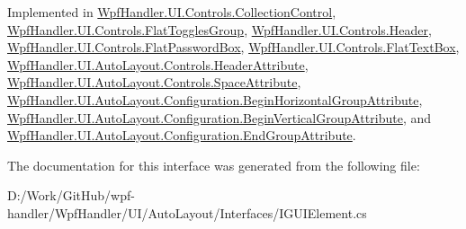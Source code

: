 Implemented in \mbox{\hyperlink{class_wpf_handler_1_1_u_i_1_1_controls_1_1_collection_control_a54cf416fee122e600059ed8713d75bb0}{Wpf\+Handler.\+U\+I.\+Controls.\+Collection\+Control}}, \mbox{\hyperlink{class_wpf_handler_1_1_u_i_1_1_controls_1_1_flat_toggles_group_a5619e5107d6cbc3fb2cdabb21deb40a4}{Wpf\+Handler.\+U\+I.\+Controls.\+Flat\+Toggles\+Group}}, \mbox{\hyperlink{class_wpf_handler_1_1_u_i_1_1_controls_1_1_header_a23ac86ea123581ee90d1aa9b6a81dadd}{Wpf\+Handler.\+U\+I.\+Controls.\+Header}}, \mbox{\hyperlink{class_wpf_handler_1_1_u_i_1_1_controls_1_1_flat_password_box_a8a06600a127d2b9bc7a1a04767f383e8}{Wpf\+Handler.\+U\+I.\+Controls.\+Flat\+Password\+Box}}, \mbox{\hyperlink{class_wpf_handler_1_1_u_i_1_1_controls_1_1_flat_text_box_a9885e81c438caeec3448c99796503a71}{Wpf\+Handler.\+U\+I.\+Controls.\+Flat\+Text\+Box}}, \mbox{\hyperlink{class_wpf_handler_1_1_u_i_1_1_auto_layout_1_1_controls_1_1_header_attribute_a837805f9b975447e7cf5663119189c37}{Wpf\+Handler.\+U\+I.\+Auto\+Layout.\+Controls.\+Header\+Attribute}}, \mbox{\hyperlink{class_wpf_handler_1_1_u_i_1_1_auto_layout_1_1_controls_1_1_space_attribute_abc4dedcaa52529fb4f0e227fb2386866}{Wpf\+Handler.\+U\+I.\+Auto\+Layout.\+Controls.\+Space\+Attribute}}, \mbox{\hyperlink{class_wpf_handler_1_1_u_i_1_1_auto_layout_1_1_configuration_1_1_begin_horizontal_group_attribute_a8bb61f969389bece86c87fbfa44d4c82}{Wpf\+Handler.\+U\+I.\+Auto\+Layout.\+Configuration.\+Begin\+Horizontal\+Group\+Attribute}}, \mbox{\hyperlink{class_wpf_handler_1_1_u_i_1_1_auto_layout_1_1_configuration_1_1_begin_vertical_group_attribute_a52859bc4d83f107cbae35d20ae97ce83}{Wpf\+Handler.\+U\+I.\+Auto\+Layout.\+Configuration.\+Begin\+Vertical\+Group\+Attribute}}, and \mbox{\hyperlink{class_wpf_handler_1_1_u_i_1_1_auto_layout_1_1_configuration_1_1_end_group_attribute_acaed685d0daf2b14d8f232389d56c478}{Wpf\+Handler.\+U\+I.\+Auto\+Layout.\+Configuration.\+End\+Group\+Attribute}}.



The documentation for this interface was generated from the following file\+:\begin{DoxyCompactItemize}
\item 
D\+:/\+Work/\+Git\+Hub/wpf-\/handler/\+Wpf\+Handler/\+U\+I/\+Auto\+Layout/\+Interfaces/I\+G\+U\+I\+Element.\+cs\end{DoxyCompactItemize}
